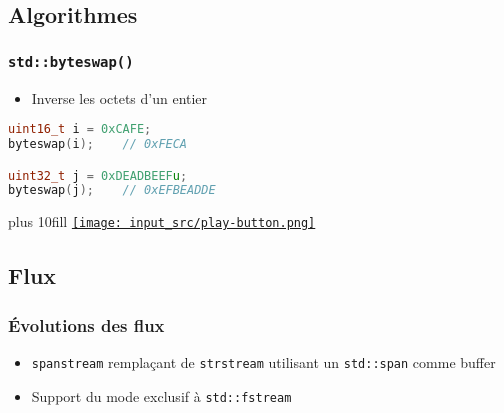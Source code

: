 \documentclass[C++.tex]{subfiles}
\begin{document}
\subsection*{Algorithmes}
\begin{frame}[fragile]
	\frametitle{\lstinline|std::byteswap()|}
	\begin{itemize}
		\item Inverse les octets d'un entier
	\end{itemize}

	\begin{lstlisting}[language=C++]
uint16_t i = 0xCAFE;
byteswap(i);	// 0xFECA

uint32_t j = 0xDEADBEEFu;
byteswap(j);	// 0xEFBEADDE\end{lstlisting}

	\vskip 10mm plus 10fill
	\hfill
	\href{https://godbolt.org/#g:!((g:!((g:!((h:codeEditor,i:(filename:'1',fontScale:14,fontUsePx:'0',j:1,lang:c%2B%2B,selection:(endColumn:1,endLineNumber:13,positionColumn:1,positionLineNumber:13,selectionStartColumn:1,selectionStartLineNumber:1,startColumn:1,startLineNumber:1),source:'%23include+%3Ciostream%3E%0A%23include+%3Ccstdint%3E%0A%23include+%3Cbit%3E%0A%0Aint+main()%0A%7B%0A++uint16_t+i+%3D+0xCAFE%3B%0A++std::cout+%3C%3C+std::hex+%3C%3C+std::byteswap(i)+%3C%3C+%22%5Cn%22%3B%0A%0A++uint32_t+j+%3D+0xDEADBEEFu%3B%0A++std::cout+%3C%3C+std::hex+%3C%3C+std::byteswap(j)+%3C%3C+%22%5Cn%22%3B%0A%7D%0A'),l:'5',n:'0',o:'C%2B%2B+source+%231',t:'0')),k:50,l:'4',n:'0',o:'',s:0,t:'0'),(g:!((h:executor,i:(argsPanelShown:'1',compilationPanelShown:'0',compiler:g122,compilerName:'',compilerOutShown:'0',execArgs:'',execStdin:'',fontScale:14,fontUsePx:'0',j:1,lang:c%2B%2B,libs:!((name:boost,ver:'175')),options:'-std%3Dc%2B%2B23+-Wall+-Wextra+-pedantic',source:1,stdinPanelShown:'1',tree:'1',wrap:'0'),l:'5',n:'0',o:'Executor+x86-64+gcc+12.2+(C%2B%2B,+Editor+%231)',t:'0')),header:(),k:50,l:'4',n:'0',o:'',s:0,t:'0')),l:'2',n:'0',o:'',t:'0')),version:4}{\texttt{[image: input\_src/play-button.png]}}
\end{frame}

\subsection*{Flux}
\begin{frame}[fragile]
	\frametitle{Évolutions des flux}
	\begin{itemize}
		\item \lstinline|spanstream| remplaçant de \lstinline|strstream| utilisant un \lstinline|std::span| comme buffer


		\item Support du mode exclusif à \lstinline|std::fstream|
	\end{itemize}
\end{frame}
\end{document}
